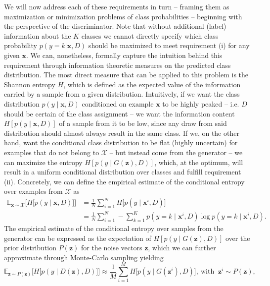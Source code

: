 \documentclass{article} \usepackage{iclr2016_conference,times}
\newcommand{\bx}{\mathbf{x}}
\newcommand{\bz}{\mathbf{z}}
\begin{document}
We will now address each of these requirements in turn -- framing them
as maximization or minimization problems of class probabilities --
beginning with the perspective of the discriminator. Note
that without additional (label) information about the $K$ classes we
cannot directly specify which class probability $p(y = k | \bx, D )$
should be maximized to meet requirement (i) for any given $\bx$.  We can,
nonetheless, formally capture the intuition behind this requirement
through information theoretic measures on the predicted class
distribution.  The most direct measure that can be applied to this
problem is the Shannon entropy $H$, which is defined as the expected
value of the information carried by a sample from a given
distribution. Intuitively, if we want the class distribution $p(y \mid
\bx, D)$ conditioned on example $\bx$ to be highly peaked -- i.e. $D$
should be certain of the class assignment -- we want the
information content $H[ p(y \mid \bx, D) ]$
of a sample from it to be low,
since any draw from said distribution should almost always result in
the same class. If we, on 
the other hand, want the conditional class distribution to be flat (highly
uncertain) for examples that do not belong to $\mathcal{X}$ -- but
instead come from the generator --
we can maximize the entropy $H[ p(y \mid G(\bz), D) ]$, which, at the
optimum, will result in a uniform conditional distribution over
classes and fulfill requirement (ii).
Concretely, we can define the empirical estimate of the conditional
entropy over examples from $\mathcal{X}$ as
\begin{equation}
\begin{aligned}
  \mathbb{E}_{\bx \sim \mathcal{X}} \Big[ H \big[ p(y \mid \bx, D)
  \big ] \Big] &=
  \frac{1}{N} \sum^N_{i=1} H \big[ p(y \mid \bx^{i}, D) \big] \\
  &= \frac{1}{N} \sum^N_{i=1} - \sum^K_{k=1} p(y = k \mid \bx^i, D) \log
  p(y = k \mid \bx^i, D).
\label{eq:ent_x}
\end{aligned}
\end{equation}
The empirical estimate of the conditional entropy over samples from
the generator can be expressed as the expectation of $H[ p(y \mid
G(\bz), D) ]$ over the prior distribution $P(\bz)$ for the noise
vectors $\bz$, which we can further approximate through Monte-Carlo
sampling yielding
\begin{equation}
  \mathbb{E}_{\bz \sim P(\bz)} \Big[ H \big[ p(y \mid D(\bz), D) \big] \Big] \approx
  \frac{1}{M} \sum^M_{i=1} H \big[ p(y \mid G(\bz^i), D) \big], \
  \text{with } \ \bz^i \sim P(\bz),
\label{eq:ent_xrec}
\end{equation}
\end{document}
